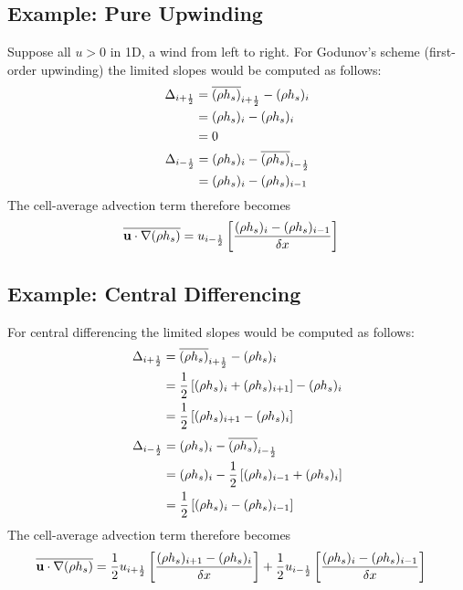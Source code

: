 \subsection{Example: Pure Upwinding}
Suppose all $u>0$ in 1D, a wind from left to right.  For Godunov's scheme (first-order upwinding) the limited slopes would be computed as follows:
\begin{align}
\Delta_{i+\mbox{\tiny $\frac{1}{2}$}} &= \overline{(\rho h_s)}_{i+\mbox{\tiny $\frac{1}{2}$}} - (\rho h_s)_i \notag\\
&= (\rho h_s)_i - (\rho h_s)_i \notag\\
&= 0
\end{align}
\begin{align}
\Delta_{i-\mbox{\tiny $\frac{1}{2}$}} &= (\rho h_s)_i - \overline{(\rho h_s)}_{i-\mbox{\tiny $\frac{1}{2}$}} \notag\\
&= (\rho h_s)_i - (\rho h_s)_{i-1}
\end{align}
The cell-average advection term therefore becomes
\begin{align}
\overline{\mathbf{u}\cdot\nabla(\rho h_s)} &= u_{i-\mbox{\tiny $\frac{1}{2}$}} \left[ \frac{(\rho h_s)_i - (\rho h_s)_{i-1}}{\delta x} \right]
\end{align}

\subsection{Example: Central Differencing}
For central differencing the limited slopes would be computed as follows:
\begin{align}
\Delta_{i+\mbox{\tiny $\frac{1}{2}$}} &= \overline{(\rho h_s)}_{i+\mbox{\tiny $\frac{1}{2}$}} - (\rho h_s)_i \notag\\
&= \frac{1}{2}\left[(\rho h_s)_i + (\rho h_s)_{i+1}\right] - (\rho h_s)_i \notag\\
&= \frac{1}{2}\left[(\rho h_s)_{i+1} - (\rho h_s)_i\right]
\end{align}
\begin{align}
\Delta_{i-\mbox{\tiny $\frac{1}{2}$}} &= (\rho h_s)_i - \overline{(\rho h_s)}_{i-\mbox{\tiny $\frac{1}{2}$}} \notag\\
&= (\rho h_s)_i - \frac{1}{2}\left[(\rho h_s)_{i-1} + (\rho h_s)_i\right] \notag\\
&= \frac{1}{2}\left[ (\rho h_s)_i - (\rho h_s)_{i-1} \right]
\end{align}
The cell-average advection term therefore becomes
\begin{align}
\overline{\mathbf{u}\cdot\nabla(\rho h_s)} &= \frac{1}{2}  u_{i+\mbox{\tiny $\frac{1}{2}$}} \left[ \frac{(\rho h_s)_{i+1} - (\rho h_s)_i}{\delta x} \right] + \frac{1}{2} u_{i-\mbox{\tiny $\frac{1}{2}$}} \left[ \frac{(\rho h_s)_i - (\rho h_s)_{i-1}}{\delta x} \right]
\end{align}

